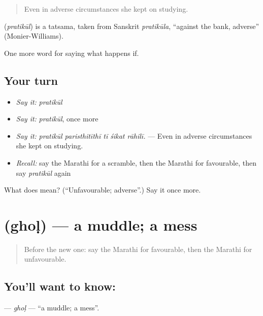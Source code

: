 \begin{quote}
Even in adverse circumstances she kept on studying.
\end{quote}

\begin{cousinweb}
\textbf{} (\emph{pratikūl}) is a tatsama, taken from Sanskrit \emph{pratikūla}, \textquotedblleft{}against the bank, adverse\textquotedblright{} (Monier-Williams).
\end{cousinweb}

\begin{grammarlens}[title={What you've built}]
One more word for saying what happens if.
\end{grammarlens}

\subsection*{Your turn}
\begin{itemize}
\raggedright
  \item \emph{Say it:} \emph{pratikūl}
  \item \emph{Say it:} \emph{pratikūl}, once more
  \item \emph{Say it:} \emph{pratikūl paristhitīthī tī śikat rāhilī.} — Even in adverse circumstances she kept on studying.
  \item \emph{Recall:} say the Marathi for a scramble, then the Marathi for favourable, then say \emph{pratikūl} again
\end{itemize}

\begin{tcolorbox}[breakable,colback=teal!4,colframe=teal!35!black,title={Before you move on}]
What does  mean? (\textquotedblleft{}Unfavourable; adverse\textquotedblright{}.) Say it once more.
\end{tcolorbox}
\section[\texorpdfstring{\mr{घोळ} (ghoḷ)}{घोळ (ghoḷ)}]{ (ghoḷ) — a muddle; a mess}

\label{lesson:MR-C556-ghol}



\begin{quote}
Before the new one: say the Marathi for favourable, then the Marathi for unfavourable.
\end{quote}

\subsection*{You'll want to know: }
\textbf{} — \emph{ghoḷ} — \textquotedblleft{}a muddle; a mess\textquotedblright{}.

